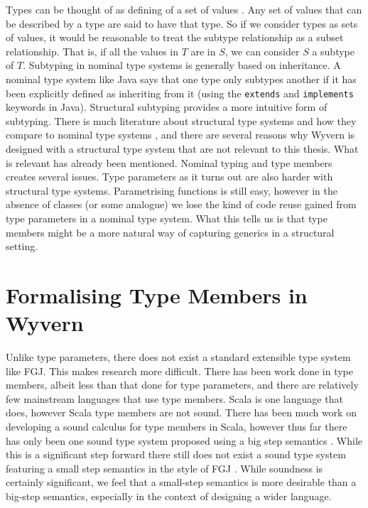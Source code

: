 \documentclass[11pt
              , a4paper
              , twoside
              , openright
              ]{report}
\numberwithin{case}{theorem}
\numberwithin{subcase}{case}
\begin{document}
Types can be thought of as defining of a set of values \cite{Cardelli:1988:SSN:73560.73566}. Any set of values that can be described by a type are said to have that type. So if we consider types as sets of values, it would be reasonable to treat the subtype relationship as a subset relationship. That is, if all the values in $T$ are in $S$, we can consider $S$ a subtype of $T$. Subtyping in nominal type systems is generally based on inheritance. A nominal type system like Java says that one type only subtypes another if it has been explicitly defined as inheriting from it (using the \verb|extends| and \verb|implements| keywords in Java). Structural subtyping provides a more intuitive form of subtyping. There is much literature about structural type systems and how they compare to nominal type systems \cite{Malayeri07integratingnominal, Jones:2015:brands, Gil:2008:WIS:1449764.1449771, Malayeri:2007:CSS:1297846.1297889,Ostermann_nominaland}, and there are several reasons why Wyvern is designed with a structural type system that are not relevant to this thesis. What is relevant has already been mentioned. Nominal typing and type members creates several issues. Type parameters as it turns out are also harder with structural type systems. Parametrising functions is still easy, however in the absence of classes (or some analogue) we lose the kind of code reuse gained from type parameters in a nominal type system. What this tells us is that type members might be a more natural way of capturing generics in a structural setting.


\section{Formalising Type Members in Wyvern}

Unlike type parameters, there does not exist a standard extensible type system like FGJ. This makes research more difficult. There has been work done in type members, albeit less than that done for type parameters, and there are relatively few mainstream languages that use type members. Scala is one language that does, however Scala type members are not sound. There has been much work on developing a sound calculus for type members in Scala, however thus far there has only been one sound type system proposed \cite{Amin:2014:FPT:2660193.2660216} using a big step semantics \cite{Kahn:1987:NS:28220.28222}. While this is a significant step forward there still does not exist a sound type system featuring a small step semantics \cite{Plotkin81astructural} in the style of FGJ \cite{Igarashi:2001:FJM:503502.503505}. While soundness is certainly significant, we feel that a small-step semantics is more desirable than a big-step semantics, especially in the context of designing a wider language.
\end{document}
